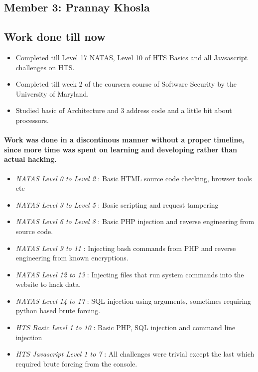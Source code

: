 \documentclass{article}
\begin{document}
\begin{itemize}
\newpage
\section*{Member 3: Prannay Khosla}
\subsection*{Work done till now}
\begin{itemize}
    \item Completed till Level 17 NATAS, Level 10 of HTS Basics and all Javsascript challenges on HTS.
    \item Completed till week 2 of the coursera course of Software Security by the  University of Maryland. 
    \item Studied basic of Architecture and 3 address code and a little bit about processors.
\end{itemize}
\paragraph{Work was done in a discontinous manner without a proper timeline, since more time was spent on learning and developing rather than actual hacking.}
\begin{itemize}
    \item \textit{NATAS Level 0 to Level 2} : Basic HTML source code checking, browser tools etc
    \item \textit{NATAS Level 3 to Level 5} : Basic scripting and request tampering
    \item \textit{NATAS Level 6 to Level 8} : Basic PHP injection and reverse engineering from source code. 
    \item \textit{NATAS Level 9 to 11} : Injecting bash commands from PHP and reverse engineering from known encryptions.
    \item \textit{NATAS Level 12 to 13} :  Injecting files that run system commands into the website to hack data. 
    \item \textit{NATAS Level 14 to 17} : SQL injection using arguments, sometimes requiring python based brute forcing. 
    \item \textit{HTS Basic Level 1 to 10} : Basic PHP, SQL injection and command line injection
    \item \textit{HTS Javascript Level 1 to 7} : All challenges were trivial except the last which required brute forcing from the console. 
\end{itemize}


\end{itemize}
\end{document}
